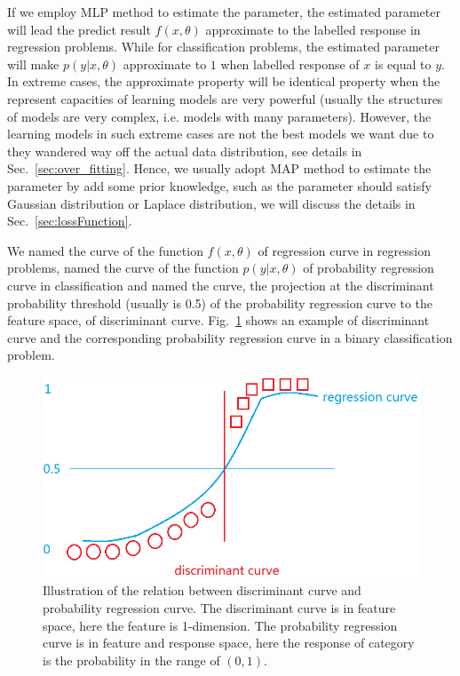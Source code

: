 \documentclass[runningheads,openany]{xhlPaper}
\begin{document}
If we employ MLP method to estimate the parameter, the estimated parameter will lead the predict result $f\left( {x,\theta } \right)$ approximate to the labelled response in regression problems. While for classification problems, the estimated parameter will make $p\left( {y|x,\theta } \right)$ approximate to $1$ when labelled response of $x$ is equal to $y$.
In extreme cases, the approximate property will be identical property when the represent capacities of learning models are very powerful (usually the structures of models are very complex, i.e. models with many parameters).
However, the learning models in such extreme cases are not the best models we want due to they wandered way off the actual data distribution, see details in Sec.~\ref{sec:over_fitting}.
Hence, we usually adopt MAP method to estimate the parameter by add some prior knowledge, such as the parameter should satisfy Gaussian distribution or Laplace distribution, we will discuss the details in Sec.~\ref{sec:lossFunction}.

We named the curve of the function $f\left( {x,\theta } \right)$ of regression curve in regression problems, named the curve of the function $p\left( {y|x,\theta } \right)$ of probability regression curve in classification and named the curve, the projection at the discriminant probability threshold (usually is 0.5) of the probability regression curve to the feature space, of discriminant curve. Fig.~\ref{fig:mlRelationOfDR} shows an example of discriminant curve and the corresponding probability regression curve in a binary classification problem. 

\begin{figure}
\centering
\includegraphics[width=0.7\linewidth]{mlRelationOfDR}
\caption{Illustration of the relation between discriminant curve and probability regression curve. The discriminant curve is in feature space, here the feature is 1-dimension. The probability regression curve is in feature and response space, here the response of category is the probability in the range of $\left(0, 1\right)$.}
\label{fig:mlRelationOfDR}
\end{figure}
\end{document}
